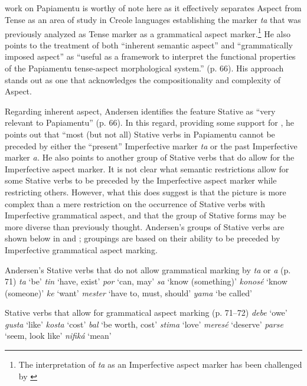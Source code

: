\subsection{\citet{Andersen1990}}\label{sec:2.1.6}

 work on Papiamentu is worthy of note here as
it effectively separates Aspect from Tense as an area of study in
Creole languages establishing the marker \textit{ta} that was
previously analyzed as Tense marker as a grammatical aspect
marker.\footnote{The interpretation of \textit{ta} as an Imperfective
  aspect marker has been challenged by  \citet{KouwenbergLefebvre2007}}
  He also points to the treatment of both ``inherent semantic aspect” and
  “grammatically imposed aspect” as “useful as a framework to interpret the functional properties of the
Papiamentu tense-aspect morphological system.” (p. 66).  His approach
stands out as one that acknowledges the compositionality and
complexity of Aspect.

Regarding inherent aspect, Andersen identifies the feature Stative as
“very relevant to Papiamentu” (p. 66).  In this regard, providing some
support for \citet{Bickerton1975}, he points out that “most (but not
all) Stative verbs in Papiamentu cannot be preceded by either the
“present” Imperfective marker \textit{ta} or the past Imperfective
marker \textit{a.}  He also points to another group of Stative verbs
that do allow for the Imperfective aspect marker.  It is not clear
what semantic restrictions allow for some Stative verbs to be preceded
by the Imperfective aspect marker while restricting others.  However,
what this does suggest is that the picture is more complex than a mere
restriction on the occurrence of Stative verbs with Imperfective
grammatical aspect, and that the group of Stative forms may be more
diverse than previously thought.  Andersen’s groups of Stative verbs
are shown below in  and ; groupings are
based on their ability to be preceded by Imperfective grammatical
aspect marking.

\ea\label{ex:2:18} Andersen’s Stative verbs that do not allow
  grammatical marking by \textit{ta} or \textit{a}
(p. 71) 
\ea \textit{ta} `be' \ex \textit{tin} `have, exist'
\ex \textit{por} `can, may' 
\ex \textit{sa} `know (something)'
\ex \textit{konosé} `know (someone)' 
\ex \textit{ke} `want' 
\ex \textit{mester} `have to, must, should'
\ex \textit{yama} `be called'
\z \z

\ea\label{ex:2:19} Stative verbs that allow for grammatical aspect
marking (p. 71--72)
\ea \textit{debe} `owe'
\ex \textit{gusta} `like'
\ex \textit{kosta} ‘cost’ 
\ex \textit{bal} `be worth, cost' 
\ex \textit{stima} `love' 
\ex \textit{meresé} `deserve'
\ex \textit{parse} `seem, look like'
\ex \textit{nifiká} `mean'
\z \z

